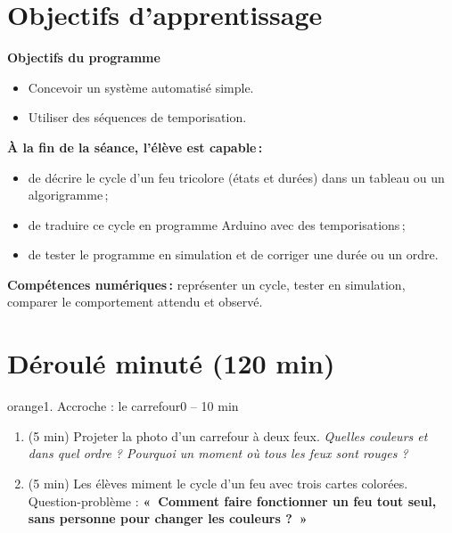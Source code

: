 \documentclass[11pt,a4paper]{article}
\begin{document}
\section{Objectifs d'apprentissage}
\begin{tcolorbox}[colback=gray!8,colframe=gray!60!black,arc=1mm,boxrule=0.5pt]
\textbf{Objectifs du programme}
\begin{itemize}
 \item Concevoir un système automatisé simple.
 \item Utiliser des séquences de temporisation.
\end{itemize}
\textbf{À la fin de la séance, l'élève est capable\,:}
\begin{itemize}
 \item de décrire le cycle d'un feu tricolore (états et durées) dans un tableau ou un algorigramme\,;
 \item de traduire ce cycle en programme Arduino avec des temporisations\,;
 \item de tester le programme en simulation et de corriger une durée ou un ordre.
\end{itemize}
\textbf{Compétences numériques\,:} représenter un cycle, tester en simulation, comparer le comportement attendu et observé.
\end{tcolorbox}

\section{Déroulé minuté (120 min)}

\begin{etape}{orange}{1. Accroche : le carrefour}{0 -- 10 min}
\begin{enumerate}
 \item (5 min) Projeter la photo d'un carrefour à deux feux. \emph{Quelles couleurs et dans quel ordre ? Pourquoi un moment où tous les feux sont rouges ?}
 \item (5 min) Les élèves miment le cycle d'un feu avec trois cartes colorées. Question-problème : \textbf{«~Comment faire fonctionner un feu tout seul, sans personne pour changer les couleurs ?~»}
\end{enumerate}
\end{etape}
\end{document}
